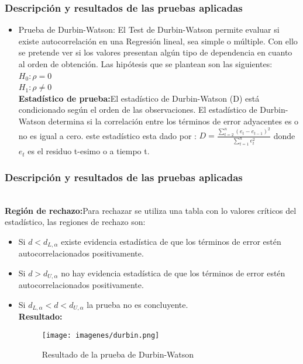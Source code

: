 \documentclass[12pt]{beamer}
\begin{document}
\begin{frame}
\frametitle{Descripción y resultados de las pruebas aplicadas}
\begin{itemize}
\item Prueba de Durbin-Watson: El Test de Durbin-Watson permite evaluar si existe autocorrelación en una Regresión lineal, sea simple o múltiple. Con ello se pretende ver si los valores presentan algún tipo de dependencia en cuanto al orden de obtención. Las hipótesis que se plantean son las siguientes:
~\\$H_{0}:\rho=0$
~\\$H_{1}:\rho\neq 0$
~\\ \textbf{Estadístico de prueba:}El estadístico de Durbin-Watson (D) está condicionado según el orden de las observaciones. El estadístico de Durbin-Watson determina si la correlación entre los términos de error adyacentes es o no es igual a cero. este estadístico esta dado por : $D=\frac{\sum\limits_{t=2}^{n}(e_{t}-e_{t-1})^2}{\sum\limits_{t=1}^{n}e_{t}^2}$ donde $e_{t}$ es el residuo t-esimo o a tiempo t.
\end{itemize}
\end{frame}

\begin{frame}
\frametitle{Descripción y resultados de las pruebas aplicadas}
~\\ \textbf{Región de rechazo:}Para rechazar se utiliza una tabla con lo valores críticos del estadístico, las regiones de rechazo son:
\begin{itemize}
\item Si $d < d_{L,\alpha}$ existe evidencia estadística de que los términos de error estén autocorrelacionados positivamente.
\item Si $d > d_{U,\alpha}$ no hay evidencia estadística de que los términos de error estén autocorrelacionados positivamente.
\item Si $d_{L,\alpha} < d < d_{U,\alpha}$ la prueba no es concluyente.
~\\ \textbf{Resultado:}
\begin{figure}[!h]
    \begin{center}
        \texttt{[image: imagenes/durbin.png]}
        \caption{Resultado de la prueba de Durbin-Watson}
        \label{fig:Densidad}
    \end{center}
\end{figure}
\end{itemize}
\end{frame}
\end{document}
